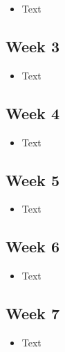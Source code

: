 \documentclass[10pt, onecolumn, draftclsnofoot, letterpaper, compsoc]{IEEEtran}
\begin{document}
\begin{itemize}

\item Text

\end{itemize}

\subsection{Week 3}

\begin{itemize}

\item Text

\end{itemize}

\subsection{Week 4}

\begin{itemize}

\item Text

\end{itemize}

\subsection{Week 5}

\begin{itemize}

\item Text

\end{itemize}

\subsection{Week 6}

\begin{itemize}

\item Text

\end{itemize}

\subsection{Week 7}

\begin{itemize}

\item Text

\end{itemize}
\end{document}
